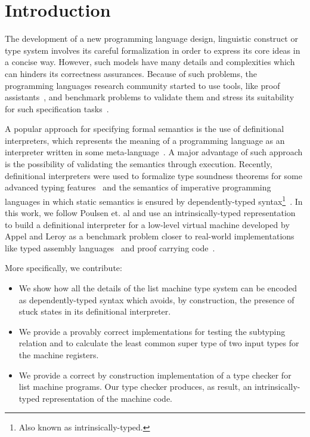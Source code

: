 \documentclass[sigconf]{acmart}
\theoremstyle{definition}
\begin{document}



\section{Introduction}

The development of a new programming language design, linguistic construct
or type system involves its careful formalization in order to express
its core ideas in a concise way. However, such models have many details
and complexities which can hinders its correctness assurances.
Because of such problems, the programming languages research community
started to use tools, like proof assistants~\cite{Stump16,Chlipala13},
and benchmark problems to validate them and stress its suitability for
such specification tasks~\cite{Aydemir05,Pientka18,Appel07}.

A popular approach for specifying formal semantics is the
use of definitional interpreters, which represents the meaning of a
programming language as an interpreter written in some
meta-language~\cite{Reynolds72}. A major advantage of such approach
is the possibility of validating the semantics through execution.
Recently, definitional interpreters were used to formalize type
soundness theorems for some advanced typing features~\cite{Amin17}
and the semantics of imperative programming languages in which static
semantics is ensured by dependently-typed
syntax\footnote{Also known as intrinsically-typed.}~\cite{Poulsen18}.
In this work, we follow Poulsen et. al and use an intrinsically-typed
representation to build a definitional interpreter for a low-level virtual
machine developed by Appel and Leroy as a benchmark problem closer to
real-world implementations like typed assembly languages~\cite{CraryM99} and
proof carrying code~\cite{Necula97}.

More specifically, we contribute:

\begin{itemize}
  \item We show how all the details of the list machine type system
        can be encoded as dependently-typed syntax which avoids, by construction,
        the presence of stuck states in its definitional interpreter.
  \item We provide a provably correct implementations for testing the subtyping
        relation and to calculate the least common super type of two input
        types for the machine registers.
  \item We provide a correct by construction implementation of a type checker for
        list machine programs. Our type checker produces, as result, an intrinsically-typed
        representation of the machine code.
\end{itemize}
\end{document}
